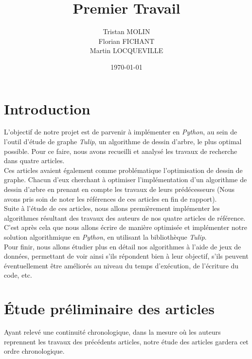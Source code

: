 \documentclass{article}
\title{Premier Travail}
\author{Tristan MOLIN\\Florian FICHANT\\Martin LOCQUEVILLE}
\date{\today}
\begin{document}
\maketitle

\tableofcontents

\newpage

\mainmatter

\section{Introduction}

L'objectif de notre projet est de parvenir à implémenter en \emph{Python}, au sein de l'outil d'étude de graphe \emph{Tulip}, un algorithme de dessin d'arbre, le plus optimal possible. Pour ce faire, nous avons recueilli et analysé les travaux de recherche dans quatre articles.\\

Ces articles avaient également comme problématique l'optimisation de dessin de graphe. Chacun d'eux cherchant à optimiser l'implémentation d'un algorithme de dessin d'arbre en prenant en compte les travaux de leurs prédécesseurs (Nous avons pris soin de noter les références de ces articles en fin de rapport).\\

Suite à l'étude de ces articles, nous allons premièrement implémenter les algorithmes résultant des travaux des auteurs de nos quatre articles de référence. C'est après cela que nous allons écrire de manière optimisée et implémenter notre solution algorithmique en \emph{Python}, en utilisant la bibliothèque \emph{Tulip}.\\

Pour finir, nous allons étudier plus en détail nos algorithmes à l'aide de jeux de données, permettant de voir ainsi s'ils répondent bien à leur objectif, s'ils peuvent éventuellement être améliorés au niveau du temps d'exécution, de l'écriture du code, etc.\\


\newpage
\section{Étude préliminaire des articles}

Ayant relevé une continuité chronologique, dans la mesure où les auteurs reprennent les travaux des précédents articles, notre étude des articles gardera cet ordre chronologique.\\
\end{document}
